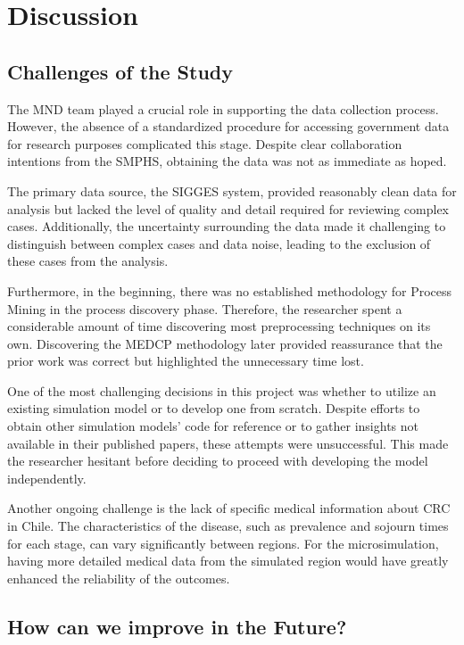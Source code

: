 \section{Discussion}

\subsection*{Challenges of the Study}

The MND team played a crucial role in supporting the data collection process. However, the absence of a standardized procedure for accessing government data for research purposes complicated this stage. Despite clear collaboration intentions from the SMPHS, obtaining the data was not as immediate as hoped.

The primary data source, the SIGGES system, provided reasonably clean data for analysis but lacked the level of quality and detail required for reviewing complex cases. Additionally, the uncertainty surrounding the data made it challenging to distinguish between complex cases and data noise, leading to the exclusion of these cases from the analysis.

Furthermore, in the beginning, there was no established methodology for Process Mining in the process discovery phase. Therefore, the researcher spent a considerable amount of time discovering most preprocessing techniques on its own. Discovering the MEDCP methodology later provided reassurance that the prior work was correct but highlighted the unnecessary time lost.

One of the most challenging decisions in this project was whether to utilize an existing simulation model or to develop one from scratch. Despite efforts to obtain other simulation models' code for reference or to gather insights not available in their published papers, these attempts were unsuccessful. This made the researcher hesitant before deciding to proceed with developing the model independently.

Another ongoing challenge is the lack of specific medical information about CRC in Chile. The characteristics of the disease, such as prevalence and sojourn times for each stage, can vary significantly between regions. For the microsimulation, having more detailed medical data from the simulated region would have greatly enhanced the reliability of the outcomes.

\subsection*{How can we improve in the Future?}

